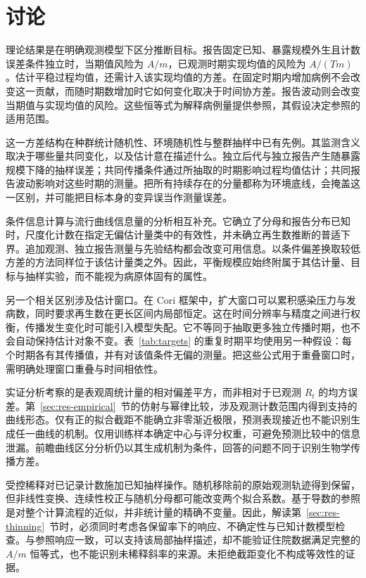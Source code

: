 \section{讨论}
\label{sec:discussion}

理论结果是在明确观测模型下区分推断目标。报告固定已知、暴露规模外生且计数误差条件独立时，当期值风险为 $A/m$，已观测时期实现均值的风险为 $A/(Tm)$。估计平稳过程均值，还需计入该实现均值的方差。在固定时期内增加病例不会改变这一贡献，而随时期数增加时它如何变化取决于时间协方差。报告波动则会改变当期值与实现均值的风险。这些恒等式为解释病例量提供参照，其假设决定参照的适用范围。

这一方差结构在种群统计随机性、环境随机性与整群抽样中已有先例\citep{engen1998demographic, cochran1977sampling}。其监测含义取决于哪些量共同变化，以及估计意在描述什么。独立后代与独立报告产生随暴露规模下降的抽样误差；共同传播条件通过所抽取的时期影响过程均值估计；共同报告波动影响对这些时期的测量。把所有持续存在的分量都称为环境底线，会掩盖这一区别，并可能把目标本身的变异误当作测量误差。

条件信息计算与流行曲线信息量的分析相互补充\citep{parag2022quantifying, parag2022fundamental}。它确立了分母和报告分布已知时，尺度化计数在指定无偏估计量类中的有效性，并未确立再生数推断的普适下界。追加观测、独立报告测量与先验结构都会改变可用信息。以条件偏差换取较低方差的方法同样位于该估计量类之外。因此，平衡规模应始终附属于其估计量、目标与抽样实验，而不能视为病原体固有的属性。

另一个相关区别涉及估计窗口。在 Cori 框架中，扩大窗口可以累积感染压力与发病数，同时要求再生数在更长区间内局部恒定\citep{cori2013new, gostic2020practical}。这在时间分辨率与精度之间进行权衡，传播发生变化时可能引入模型失配。它不等同于抽取更多独立传播时期，也不会自动保持估计对象不变。表~\ref{tab:targets} 的重复时期平均使用另一种假设：每个时期各有其传播值，并有对该值条件无偏的测量。把这些公式用于重叠窗口时，需明确处理窗口重叠与时间相依性。

实证分析考察的是表观周统计量的相对偏差平方，而非相对于已观测 $R_t$ 的均方误差。第~\ref{sec:res-empirical}~节的仿射与幂律比较，涉及观测计数范围内得到支持的曲线形态。仅有正的拟合截距不能确立非零渐近极限，预测表现接近也不能识别生成任一曲线的机制。仅用训练样本确定中心与评分权重，可避免预测比较中的信息泄漏。前瞻曲线区分分析仍以其生成机制为条件，回答的问题不同于识别生物学传播方差。

受控稀释对已记录计数施加已知抽样操作。随机移除前的原始观测轨迹得到保留，但非线性变换、连续性校正与随机分母都可能改变两个拟合系数。基于导数的参照是对整个计算流程的近似，并非统计量的精确不变量。因此，解读第~\ref{sec:res-thinning}~节时，必须同时考虑各保留率下的响应、不确定性与已知计数模型检查。与参照响应一致，可以支持该局部抽样描述，却不能验证住院数据满足完整的 $A/m$ 恒等式，也不能识别未稀释斜率的来源。未拒绝截距变化不构成等效性的证据。

